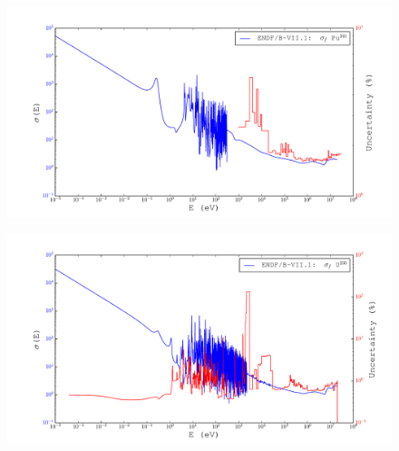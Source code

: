 \documentclass{beamer}
\begin{document}
\begin{frame}
    \begin{figure}[H]
    \begin{center}
      \hspace*{-0.7cm}\includegraphics[width=1.1\columnwidth]{../Weighting/X_Sections/XwVar_Pu_241_94_f.pdf}
      \vspace{-5mm}
      \label{fig:XPu241}
    \end{center}
  \end{figure}
\end{frame}

\begin{frame}
  \begin{figure}[H]
    \begin{center}
      \hspace*{-0.7cm}\includegraphics[width=1.1\columnwidth]{../Weighting/X_Sections/XwVar_U_235_92_f.pdf}
      \vspace{-5mm}
      \label{fig:XU235}
    \end{center}
  \end{figure}
\end{frame}
\end{document}
